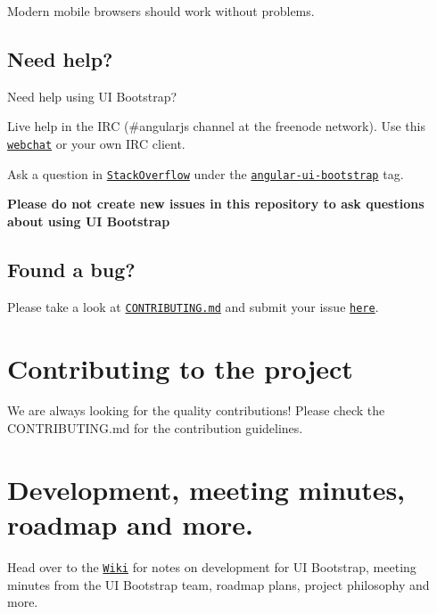 Modern mobile browsers should work without problems.

\subsection*{Need help?}

Need help using UI Bootstrap?


\begin{DoxyItemize}
\item Live help in the I\+RC ({\ttfamily \#angularjs} channel at the {\ttfamily freenode} network). Use this \href{https://webchat.freenode.net/}{\tt webchat} or your own I\+RC client.
\item Ask a question in \href{http://stackoverflow.com/}{\tt Stack\+Overflow} under the \href{http://stackoverflow.com/questions/tagged/angular-ui-bootstrap}{\tt angular-\/ui-\/bootstrap} tag.
\end{DoxyItemize}

{\bfseries Please do not create new issues in this repository to ask questions about using UI Bootstrap}

\subsection*{Found a bug?}

Please take a look at \href{CONTRIBUTING.md#you-think-youve-found-a-bug}{\tt C\+O\+N\+T\+R\+I\+B\+U\+T\+I\+N\+G.\+md} and submit your issue \href{https://github.com/angular-ui/bootstrap/issues/new}{\tt here}.





\section*{Contributing to the project}

We are always looking for the quality contributions! Please check the C\+O\+N\+T\+R\+I\+B\+U\+T\+I\+NG.md for the contribution guidelines.

\section*{Development, meeting minutes, roadmap and more.}

Head over to the \href{https://github.com/angular-ui/bootstrap/wiki}{\tt Wiki} for notes on development for UI Bootstrap, meeting minutes from the UI Bootstrap team, roadmap plans, project philosophy and more. 
